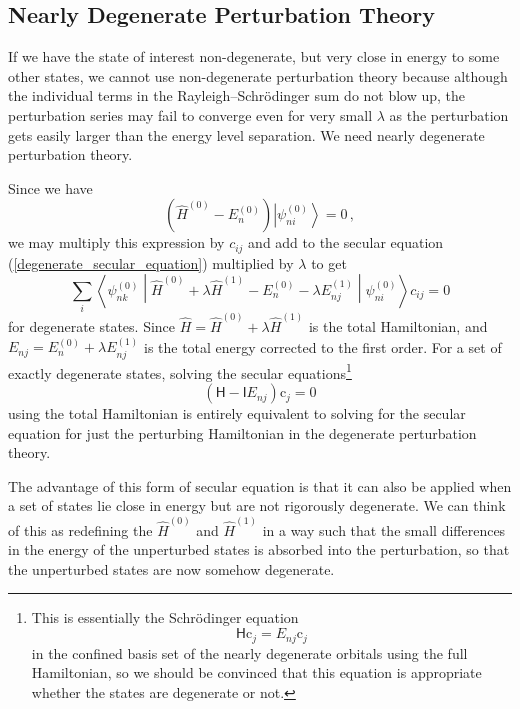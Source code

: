 \documentclass{article}
\theoremstyle{plain}\theoremheaderfont{\normalfont\itshape}\theorembodyfont{\rmfamily}\theoremseparator{.}\newtheorem*{rem}{Remark}\newtheorem*{ex}{Example}\newtheorem*{proof}{Proof}\newtheorem*{altp}{Alternative proof}
\theoremstyle{plain}\theoremheaderfont{\normalfont\bfseries}\theorembodyfont{\rmfamily}\theoremseparator{.}\newtheorem{thm}{Theorem}[section]\newtheorem{lem}[thm]{Lemma}\newtheorem{prop}[thm]{Proposition}\newtheorem*{cor}{Corollary}\newtheorem{defn}[thm]{Definition}\newtheorem{clm}[thm]{Claim}\newtheorem{clminproof}{Claim}
\theoremstyle{break}\theoremheaderfont{\normalfont\itshape}\theorembodyfont{\rmfamily}\theoremseparator{.\medskip}\newtheorem*{proofskip}{Proof}\newtheorem*{exs}{Examples}\newtheorem*{rems}{Remarks}
\theoremstyle{break}\theoremheaderfont{\normalfont\bfseries}\theorembodyfont{\rmfamily}\theoremseparator{.\medskip}\newtheorem{lemskip}[thm]{Lemma}\newtheorem{defnskip}[thm]{Definition}\newtheorem{propskip}[thm]{Proposition}\newtheorem{thmskip}[thm]{Theorem}
\numberwithin{equation}{section}
\newcommand{\ket}[1]{\left| #1 \right\rangle}
\newcommand{\mel}[3]{\left\langle #1 \middle| #2 \middle| #3 \right\rangle}
\newcommand{\vb}[1]{\bm{\mathrm{#1}}}
\begin{document}
    \subsection{Nearly Degenerate Perturbation Theory}
    If we have the state of interest non-degenerate, but very close in energy to some other states, we cannot use non-degenerate perturbation theory because although the individual terms in the Rayleigh--Schr\"{o}dinger sum do not blow up, the perturbation series may fail to converge even for very small \(\lambda\) as the perturbation gets easily larger than the energy level separation. We need nearly degenerate perturbation theory.

    Since we have
    \begin{equation}
        (\hat{H}^{(0)}-E_n^{(0)})\ket{\psi_{ni}^{(0)}}=0\,,
    \end{equation}
    we may multiply this expression by \(c_{ij}\) and add to the secular equation (\ref{degenerate_secular_equation}) multiplied by \(\lambda\) to get
    \begin{equation}
        \sum_i\mel{\psi_{nk}^{(0)}}{\hat{H}^{(0)}+\lambda\hat{H}^{(1)}-E_n^{(0)}-\lambda E_{nj}^{(1)}}{\psi_{ni}^{(0)}}c_{ij}=0
    \end{equation}
    for degenerate states. Since \(\hat{H}=\hat{H}^{(0)}+\lambda\hat{H}^{(1)}\) is the total Hamiltonian, and \(E_{nj}=E_n^{(0)}+\lambda E_{nj}^{(1)}\) is the total energy corrected to the first order. For a set of exactly degenerate states, solving the secular equations\footnote{This is essentially the Schr\"{o}dinger equation
    \begin{equation}
        \mathsf{H}\vb{c}_j=E_{nj}\vb{c}_j
    \end{equation}
    in the confined basis set of the nearly degenerate orbitals using the full Hamiltonian, so we should be convinced that this equation is appropriate whether the states are degenerate or not.}
    \begin{equation}
        (\mathsf{H}-\mathsf{I}E_{nj})\vb{c}_j=\vb{0}
    \end{equation}
    using the total Hamiltonian is entirely equivalent to solving for the secular equation for just the perturbing Hamiltonian in the degenerate perturbation theory.

    The advantage of this form of secular equation is that it can also be applied when a set of states lie close in energy but are not rigorously degenerate. We can think of this as redefining the \(\hat{H}^{(0)}\) and \(\hat{H}^{(1)}\) in a way such that the small differences in the energy of the unperturbed states is absorbed into the perturbation, so that the unperturbed states are now somehow degenerate.
\end{document}
